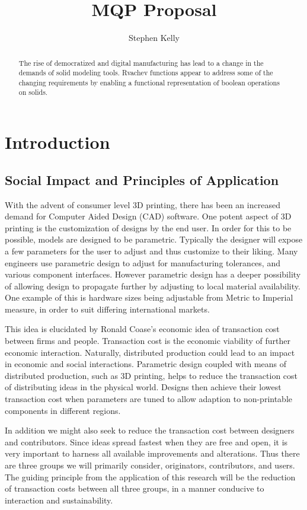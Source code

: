 \documentclass[a4paper]{article}
\title{MQP Proposal}
\author{Stephen Kelly}
\begin{document}
\maketitle

\begin{abstract}
The rise of democratized and digital manufacturing has lead to a change in the demands of solid modeling tools. Rvachev functions appear to address some of the changing requirements by enabling a functional representation of boolean operations on solids. 
\end{abstract}

\section{Introduction}
\subsection{Social Impact and Principles of Application}
With the advent of consumer level 3D printing, there has been an increased demand for Computer Aided Design (CAD) software.  One potent aspect of 3D printing is the customization of designs by the end user. In order for this to be possible, models are designed to be parametric. Typically the designer will expose a few parameters for the user to adjust and thus customize to their liking. Many engineers use parametric design to adjust for manufacturing tolerances, and various component interfaces. However parametric design has a deeper possibility of allowing design to propagate further by adjusting to local material availability. One example of this is hardware sizes being adjustable from Metric to Imperial measure, in order to suit differing international markets. 

This idea is elucidated by Ronald Coase's economic idea of transaction cost between firms and people. \cite{CoaseNature} Transaction cost is the economic viability of further economic interaction. Naturally, distributed production could lead to an impact in economic and social interactions. Parametric design coupled with means of distributed production, such as 3D printing, helps to reduce the transaction cost of distributing ideas in the physical world. Designs then achieve their lowest transaction cost when parameters are tuned to allow adaption to non-printable components in different regions. 

In addition we might also seek to reduce the transaction cost between designers and contributors. Since ideas spread fastest when they are free and open, it is very important to harness all available improvements and alterations. Thus there are three groups we will primarily consider, originators, contributors, and users. The guiding principle from the application of this research will be the reduction of transaction costs between all three groups, in a manner conducive to interaction and sustainability.
\end{document}
